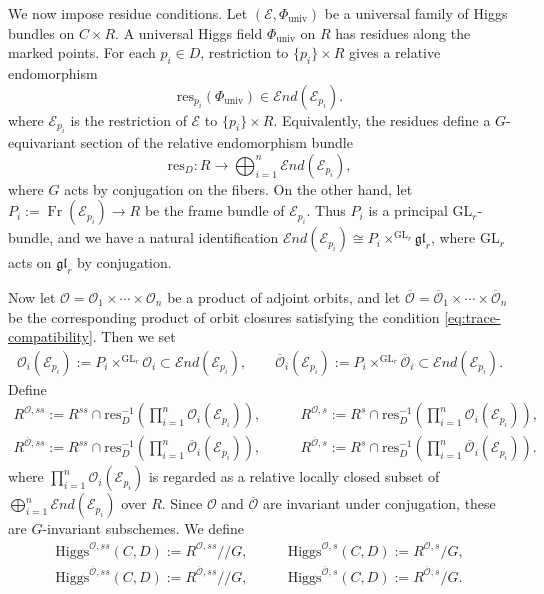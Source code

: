 \documentclass[11pt]{amsart}
\theoremstyle{plain}
\theoremstyle{definition}
\theoremstyle{remark}
\newcommand{\End}{\mathcal E nd}
\newcommand{\GL}{\mathrm{GL}}
\newcommand{\ov}[1]{\overline{#1}}
\newcommand{\Fr}{\operatorname{Fr}}
\newcommand{\cO}{\mathcal O}
\newcommand{\Higgs}{\mathrm{Higgs}}
\def\res{\mathrm{res}}
\begin{document}
We now impose residue conditions. Let $(\mathcal{E}, \Phi_{\mathrm{univ}})$ be a universal family of Higgs bundles on $C\times R$. A universal Higgs field $\Phi_{\mathrm{univ}}$ on $R$ has residues along the marked points. For each $p_i\in D$, restriction to $\{p_i\}\times R$ gives a relative endomorphism
\[
\res_{p_i}(\Phi_{\mathrm{univ}})\in \End(\mathcal E_{p_i}).
\]
where $\mathcal{E}_{p_i}$ is the restriction of $\mathcal{E}$ to $\{p_i\} \times R$. 
Equivalently, the residues define a $G$-equivariant section of the relative endomorphism bundle
\[
\res_D:R\longrightarrow \bigoplus_{i=1}^n\End(\mathcal E_{p_i}),
\]
where $G$ acts by conjugation on the fibers. On the other hand, let $P_i:=\Fr(\mathcal E_{p_i})\to R$
be the frame bundle of $\mathcal E_{p_i}$. Thus $P_i$ is a principal
$\GL_r$-bundle, and we have a natural identification $\End(\mathcal E_{p_i})
\cong
P_i\times^{\GL_r}\mathfrak{gl}_r$,
where $\GL_r$ acts on $\mathfrak{gl}_r$ by conjugation. 

Now let $\cO=\cO_1\times\cdots\times\cO_n$ be a product of adjoint orbits, and let
$\ov\cO=\ov\cO_1\times\cdots\times\ov\cO_n$
be the corresponding product of orbit closures satisfying the condition \eqref{eq:trace-compatibility}. Then we set 
\[
\begin{aligned}
    {\cO}_i(\mathcal E_{p_i}) :=
P_i\times^{\GL_r}{\cO}_i
\subset
\End(\mathcal E_{p_i}),\qquad 
\ov{\cO}_i(\mathcal E_{p_i}) :=
P_i\times^{\GL_r}\ov{\cO}_i
\subset
\End(\mathcal E_{p_i}). 
\end{aligned}
\]
\noindent Define
\[
\begin{aligned}
R^{\cO,ss}:=R^{ss}\cap\res_D^{-1}\left(\prod_{i=1}^n\cO_i(\mathcal{E}_{p_i})\right), &
\qquad
R^{\cO,s}:=R^s\cap\res_D^{-1}\left(\prod_{i=1}^n\cO_i(\mathcal{E}_{p_i})\right),\\
R^{\ov\cO,ss}:=R^{ss}\cap\res_D^{-1}\left(\prod_{i=1}^n\ov{\cO}_i(\mathcal{E}_{p_i})\right), &
\qquad
R^{\ov\cO,s}:=R^s\cap\res_D^{-1}\left(\prod_{i=1}^n\ov{\cO}_i(\mathcal{E}_{p_i})\right).
\end{aligned}
\]
\noindent where $\prod_{i=1}^n \cO_i(\mathcal E_{p_i})$ is regarded as a relative
locally closed subset of $\bigoplus_{i=1}^n \End(\mathcal E_{p_i})$ over $R$. Since $\cO$ and $\ov\cO$ are invariant under conjugation, these are $G$-invariant subschemes. We define
\[
\begin{aligned}
    \Higgs^{\cO,ss}(C,D):=R^{\cO,ss}//G, &
\qquad
\Higgs^{\cO,s}(C,D):=R^{\cO,s}/G, \\
\Higgs^{\ov\cO,ss}(C,D):=R^{\ov\cO,ss}//G, &
\qquad
\Higgs^{\ov\cO,s}(C,D):=R^{\ov\cO,s}/G.
\end{aligned}
\]
\end{document}

